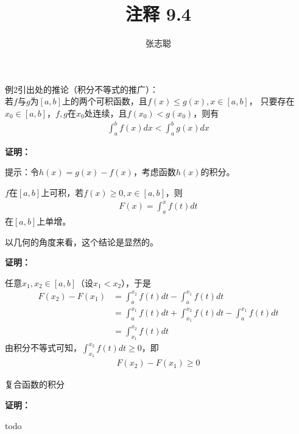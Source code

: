 \documentclass{article}
\begin{document}
\title{注释 9.4}
\author{张志聪}
\maketitle

\begin{zremark}
  例2引出处的推论（积分不等式的推广）：\\
  若$f$与$g$为$[a,b]$上的两个可积函数，且$f(x) \leq g(x), x \in [a,b]$，
  只要存在$x_0 \in [a,b]$，$f,g$在$x_0$处连续，且$f(x_0) < g(x_0)$，则有
  \begin{align*}
    \int_a^b f(x) dx < \int_a^b g(x) dx
  \end{align*}
\end{zremark}

\textbf{证明：}

提示：令$h(x) = g(x) - f(x)$，考虑函数$h(x)$的积分。

\begin{zremark}
  $f$在$[a, b]$上可积，若$f(x) \geq 0, x \in [a, b]$，则
  \begin{align*}
    F(x) = \int_a^x f(t) dt
  \end{align*}
  在$[a, b]$上单增。
\end{zremark}
以几何的角度来看，这个结论是显然的。

\textbf{证明：}

任意$x_1, x_2 \in [a, b]$（设$x_1 < x_2$），于是
\begin{align*}
  F(x_2) - F(x_1)
   & = \int_a^{x_2} f(t) dt - \int_a^{x_1} f(t) dt                            \\
   & = \int_a^{x_1} f(t) dt + \int_{x_1}^{x_2} f(t) dt - \int_a^{x_1} f(t) dt \\
   & = \int_{x_1}^{x_2} f(t) dt                                               
\end{align*}
由积分不等式可知，$\int_{x_1}^{x_2} f(t) dt \geq 0$，即
\begin{align*}
  F(x_2) - F(x_1) \geq 0
\end{align*}



\begin{zremark}
  复合函数的积分
\end{zremark}

\textbf{证明：}

todo
\end{document}
